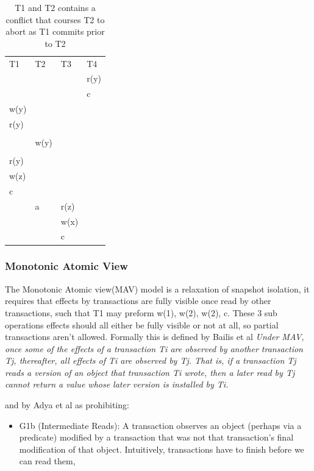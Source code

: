 \documentclass[a4paper,10pt,titlepage]{report}
\begin{document}
    \begin{table}[h]
        \begin{tabular}{l|l|l|l}
            T1   & T2   & T3   & T4   \\
            &      &      & r(y) \\
            &      &      & c    \\
            w(y) &      &      &      \\
            r(y) &      &      &      \\
            &      &      &      \\
            & w(y) &      &      \\
            &      &      &      \\
            r(y) &      &      &      \\
            w(z) &      &      &      \\
            c    &      &      &      \\
            & a    & r(z) &      \\
            &      & w(x) &      \\
            &      & c    &
        \end{tabular}
        \caption{T1 and T2 contains a conflict that courses T2 to abort as T1 commits prior to T2}
    \end{table}



    \subsubsection{Monotonic Atomic View}
    The Monotonic Atomic view(MAV) model is a relaxation of snapshot isolation, it requires that effects by transactions are fully visible once read by other transactions, such that T1 may preform w(1), w(2), w(2), c. These 3 sub operations effects should all either be fully visible or not at all, so partial transactions aren't allowed. Formally this is defined by Bailis et al \cite{HighlyAvailableTransactionsVirtuesandLimitations}
    \textit{Under MAV, once some of the effects of a transaction Ti are observed by another transaction Tj, thereafter, all effects of Ti are observed by Tj. That is, if a transaction Tj reads a version of an object that transaction Ti wrote, then a later read by Tj cannot return a value whose later version is installed by Ti.}

    and by Adya et al\cite{Adya99weakconsistency} as prohibiting:
    \begin{itemize}
        \item G1b (Intermediate Reads): A transaction observes an object (perhaps via a predicate) modified by a transaction that was not that transaction's final modification of that object. Intuitively, transactions have to finish before we can read them,
    \end{itemize}
\end{document}
